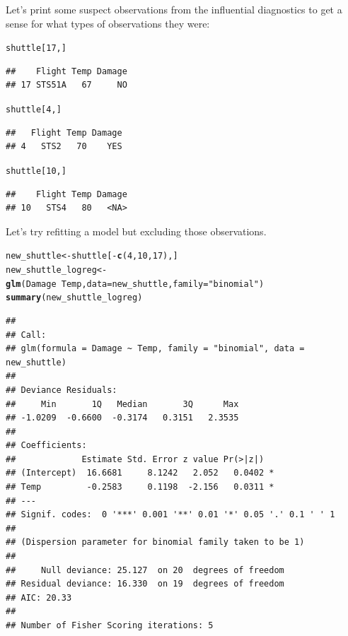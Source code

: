 \documentclass{article}\usepackage[]{graphicx}\usepackage[]{color}
\makeatletter
\newcommand{\hlnum}[1]{\textcolor[rgb]{0.686,0.059,0.569}{#1}}%
\newcommand{\hlstr}[1]{\textcolor[rgb]{0.192,0.494,0.8}{#1}}%
\newcommand{\hlopt}[1]{\textcolor[rgb]{0,0,0}{#1}}%
\newcommand{\hlstd}[1]{\textcolor[rgb]{0.345,0.345,0.345}{#1}}%
\newcommand{\hlkwb}[1]{\textcolor[rgb]{0.69,0.353,0.396}{#1}}%
\newcommand{\hlkwc}[1]{\textcolor[rgb]{0.333,0.667,0.333}{#1}}%
\newcommand{\hlkwd}[1]{\textcolor[rgb]{0.737,0.353,0.396}{\textbf{#1}}}%
\newenvironment{kframe}{%
 \def\at@end@of@kframe{}%
 \ifinner\ifhmode%
  \def\at@end@of@kframe{\end{minipage}}%
  \begin{minipage}{\columnwidth}%
 \fi\fi%
 \def\FrameCommand##1{\hskip\@totalleftmargin \hskip-\fboxsep
 \colorbox{shadecolor}{##1}\hskip-\fboxsep
     \hskip-\linewidth \hskip-\@totalleftmargin \hskip\columnwidth}%
 \MakeFramed {\advance\hsize-\width
   \@totalleftmargin\z@ \linewidth\hsize
   \@setminipage}}%
 {\par\unskip\endMakeFramed%
 \at@end@of@kframe}
\newenvironment{knitrout}{}{} %
\makeatother
\begin{document}
Let's print some suspect observations from the influential diagnostics to get a sense for what types of observations they were:

\begin{knitrout}
\color{fgcolor}\begin{kframe}
\begin{alltt}
\hlstd{shuttle[}\hlnum{17}\hlstd{, ]}
\end{alltt}
\begin{verbatim}
##    Flight Temp Damage
## 17 STS51A   67     NO
\end{verbatim}
\begin{alltt}
\hlstd{shuttle[}\hlnum{4}\hlstd{, ]}
\end{alltt}
\begin{verbatim}
##   Flight Temp Damage
## 4   STS2   70    YES
\end{verbatim}
\begin{alltt}
\hlstd{shuttle[}\hlnum{10}\hlstd{, ]}
\end{alltt}
\begin{verbatim}
##    Flight Temp Damage
## 10   STS4   80   <NA>
\end{verbatim}
\end{kframe}
\end{knitrout}

Let's try refitting a model but excluding those observations.

\begin{knitrout}
\color{fgcolor}\begin{kframe}
\begin{alltt}
\hlstd{new_shuttle} \hlkwb{<-} \hlstd{shuttle[}\hlopt{-}\hlkwd{c}\hlstd{(}\hlnum{4}\hlstd{,} \hlnum{10}\hlstd{,} \hlnum{17}\hlstd{), ]}
\hlstd{new_shuttle_logreg} \hlkwb{<-} \hlkwd{glm}\hlstd{(Damage} \hlopt{~} \hlstd{Temp,} \hlkwc{data} \hlstd{= new_shuttle,} \hlkwc{family} \hlstd{=} \hlstr{"binomial"}\hlstd{)}
\hlkwd{summary}\hlstd{(new_shuttle_logreg)}
\end{alltt}
\begin{verbatim}
## 
## Call:
## glm(formula = Damage ~ Temp, family = "binomial", data = new_shuttle)
## 
## Deviance Residuals: 
##     Min       1Q   Median       3Q      Max  
## -1.0209  -0.6600  -0.3174   0.3151   2.3535  
## 
## Coefficients:
##             Estimate Std. Error z value Pr(>|z|)  
## (Intercept)  16.6681     8.1242   2.052   0.0402 *
## Temp         -0.2583     0.1198  -2.156   0.0311 *
## ---
## Signif. codes:  0 '***' 0.001 '**' 0.01 '*' 0.05 '.' 0.1 ' ' 1
## 
## (Dispersion parameter for binomial family taken to be 1)
## 
##     Null deviance: 25.127  on 20  degrees of freedom
## Residual deviance: 16.330  on 19  degrees of freedom
## AIC: 20.33
## 
## Number of Fisher Scoring iterations: 5
\end{verbatim}
\end{kframe}
\end{knitrout}
\end{document}
